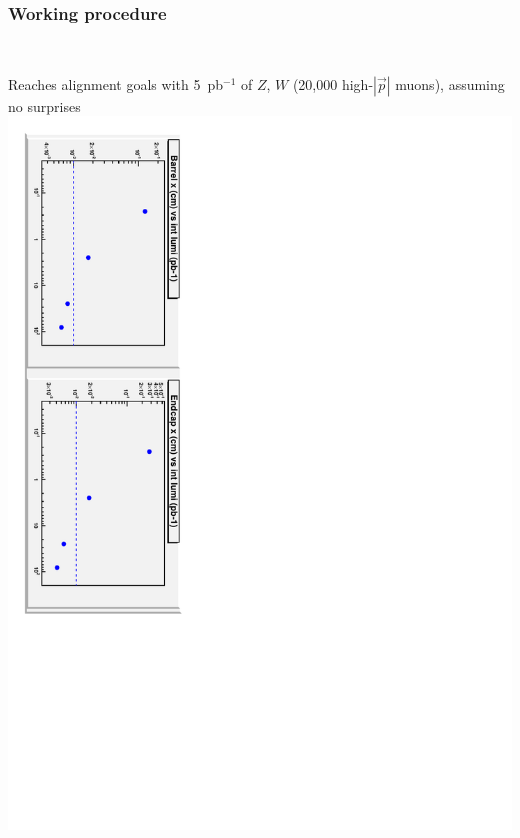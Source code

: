 \documentclass[compress]{beamer}
\begin{document}
\begin{frame}
\frametitle{Working procedure}
\begin{columns}
\mbox{ } \\
Reaches alignment goals with 5~pb$^{-1}$ of $Z$, $W$ (20,000 high-$|\vec{p}|$ muons), assuming no surprises
\vspace{-0.75 cm} \includegraphics[height=\linewidth, angle=90]{events_x_wacky.pdf}
\end{columns}
\begin{center}
\begin{minipage}{0.8\linewidth}
\begin{columns}

\end{columns}
\end{minipage}
\end{center}
\end{frame}
\end{document}
